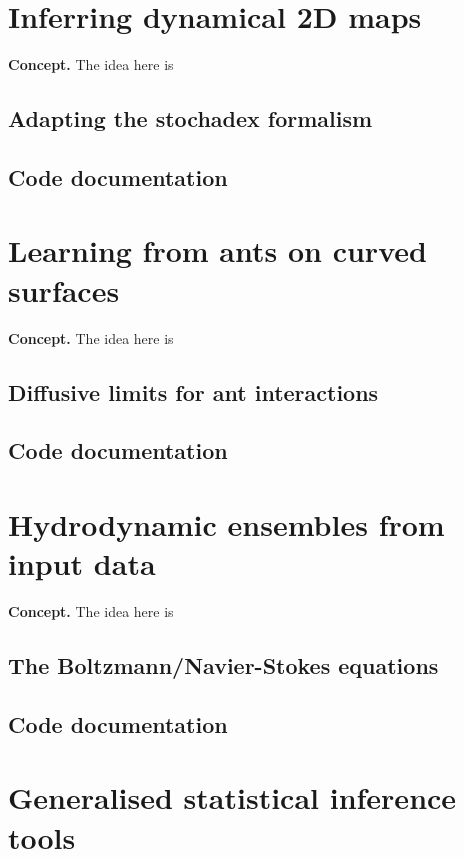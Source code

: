 \documentclass{book}
\begin{document}
\chapter{\sffamily Inferring dynamical 2D maps}

{\bfseries\sffamily Concept.} The idea here is 


\section{\sffamily Adapting the stochadex formalism}

\section{\sffamily Code documentation}


\chapter{\sffamily Learning from ants on curved surfaces}

{\bfseries\sffamily Concept.} The idea here is 

\section{\sffamily Diffusive limits for ant interactions}

\section{\sffamily Code documentation}


\chapter{\sffamily Hydrodynamic ensembles from input data}

{\bfseries\sffamily Concept.} The idea here is 


\section{\sffamily The Boltzmann/Navier-Stokes equations}


\section{\sffamily Code documentation}

\chapter{\sffamily Generalised statistical inference tools}
\end{document}
